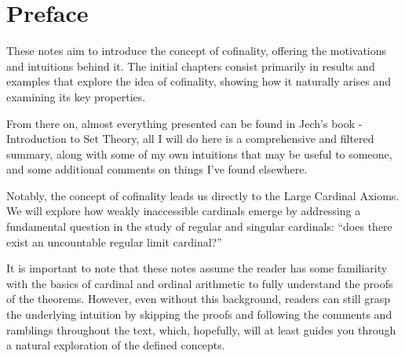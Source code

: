 \chapter*{Preface}

These notes aim to introduce the concept of cofinality, offering the motivations and intuitions behind it. The initial chapters consist primarily in results and examples that explore the idea of cofinality, showing how it naturally arises and examining its key properties.

From there on, almost everything presented can be found in Jech's book - Introduction to Set Theory, all I will do here is a comprehensive and filtered summary, along with some of my own intuitions that may be useful to someone, and some additional comments on things I've found elsewhere.

Notably, the concept of cofinality leads us directly to the Large Cardinal Axioms. We will explore how weakly inaccessible cardinals emerge by addressing a fundamental question in the study of regular and singular cardinals: ``does there exist an uncountable regular limit cardinal?''

It is important to note that these notes assume the reader has some familiarity with the basics of cardinal and ordinal arithmetic to fully understand the proofs of the theorems. However, even without this background, readers can still grasp the underlying intuition by skipping the proofs and following the comments and ramblings throughout the text, which, hopefully, will at least guides you through a natural exploration of the defined concepts.